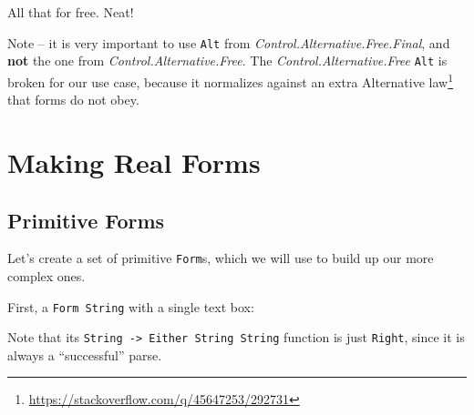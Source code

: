\documentclass[]{article}
\newenvironment{Shaded}{}{}
\newcommand{\CommentTok}[1]{\textcolor[rgb]{0.38,0.63,0.69}{\textit{#1}}}
\newcommand{\DataTypeTok}[1]{\textcolor[rgb]{0.56,0.13,0.00}{#1}}
\newcommand{\FunctionTok}[1]{\textcolor[rgb]{0.02,0.16,0.49}{#1}}
\newcommand{\NormalTok}[1]{#1}
\newcommand{\OperatorTok}[1]{\textcolor[rgb]{0.40,0.40,0.40}{#1}}
\newcommand{\OtherTok}[1]{\textcolor[rgb]{0.00,0.44,0.13}{#1}}
\renewcommand{\href}[2]{#2\footnote{\url{#1}}}
\begin{document}
All that for free. Neat!

Note -- it is very important to use \texttt{Alt} from
\emph{Control.Alternative.Free.Final}, and \textbf{not} the one from
\emph{Control.Alternative.Free}. The \emph{Control.Alternative.Free}
\texttt{Alt} is broken for our use case, because it normalizes against
\href{https://stackoverflow.com/q/45647253/292731}{an extra Alternative law}
that forms do not obey.

\section{Making Real Forms}\label{making-real-forms}

\subsection{Primitive Forms}\label{primitive-forms}

Let's create a set of primitive \texttt{Form}s, which we will use to build up
our more complex ones.

First, a \texttt{Form\ String} with a single text box:

\begin{Shaded}
\end{Shaded}

Note that its \texttt{String\ -\textgreater{}\ Either\ String\ String} function
is just \texttt{Right}, since it is always a ``successful'' parse.
\end{document}
